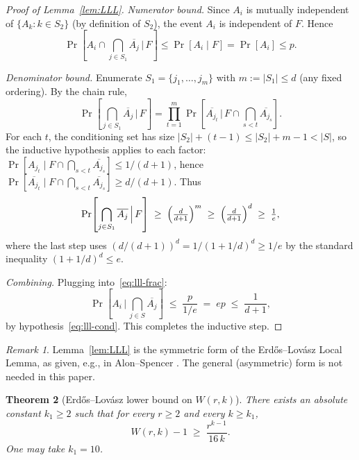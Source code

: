 \documentclass[11pt,reqno,a4paper]{amsart}
\theoremstyle{plain}
\newtheorem{theorem}{Theorem}[section]
\theoremstyle{definition}
\theoremstyle{remark}
\newtheorem{remark}[theorem]{Remark}
\numberwithin{equation}{section}
\begin{document}
\begin{proof}[Proof of Lemma~\ref{lem:LLL}]
\emph{Numerator bound.} Since $A_{i}$ is mutually independent of
$\{A_{k}:k\in S_{2}\}$ (by definition of $S_{2}$), the event $A_{i}$
is independent of $F$. Hence
\[
\Pr\!\left[A_{i}\cap\bigcap_{j\in S_{1}}\overline{A_{j}}\,\Big|\,F\right]
\le\Pr[A_{i}\mid F]=\Pr[A_{i}]\le p.
\]

\emph{Denominator bound.} Enumerate $S_{1}=\{j_{1},\ldots,j_{m}\}$ with
$m:=|S_{1}|\le d$ (any fixed ordering). By the chain rule,
\[
\Pr\!\left[\bigcap_{j\in S_{1}}\overline{A_{j}}\,\Big|\,F\right]
=\prod_{t=1}^{m}\Pr\!\left[\overline{A_{j_{t}}}\,\Big|\,F\cap\bigcap_{s<t}\overline{A_{j_{s}}}\right].
\]
For each $t$, the conditioning set has size
$|S_{2}|+(t-1)\le|S_{2}|+m-1<|S|$, so the inductive hypothesis applies
to each factor:
$\Pr[A_{j_{t}}\mid F\cap\bigcap_{s<t}\overline{A_{j_{s}}}]\le 1/(d+1)$,
hence
$\Pr[\overline{A_{j_{t}}}\mid F\cap\bigcap_{s<t}\overline{A_{j_{s}}}]\ge d/(d+1)$.
Thus
\[
\Pr\!\left[\bigcap_{j\in S_{1}}\overline{A_{j}}\,\Big|\,F\right]
\;\ge\;\Bigl(\tfrac{d}{d+1}\Bigr)^{m}\;\ge\;\Bigl(\tfrac{d}{d+1}\Bigr)^{d}
\;\ge\;\tfrac{1}{e},
\]
where the last step uses $(d/(d+1))^{d}=1/(1+1/d)^{d}\ge 1/e$ by the
standard inequality $(1+1/d)^{d}\le e$.

\emph{Combining.} Plugging into~\eqref{eq:lll-frac}:
\[
\Pr\!\left[A_{i}\,\Big|\,\bigcap_{j\in S}\overline{A_{j}}\right]
\;\le\;\frac{p}{1/e}\;=\;ep\;\le\;\frac{1}{d+1},
\]
by hypothesis~\eqref{eq:lll-cond}. This completes the inductive step.
\end{proof}

\begin{remark}
\label{rem:LLL-ref}
Lemma~\ref{lem:LLL} is the symmetric form of the Erd\H{o}s--Lov\'asz
Local Lemma, as given, e.g., in Alon--Spencer
\cite[Chapter~5, Lemma~5.1.1 and Corollary~5.1.2]{AlonSpencer2016}.
The general (asymmetric) form is not needed in this paper.
\end{remark}

\begin{theorem}[Erd\H{o}s--Lov\'asz lower bound on $W(r,k)$]
\label{thm:EL}
There exists an absolute constant $k_{1}\ge 2$ such that for every
$r\ge 2$ and every $k\ge k_{1}$,
\begin{equation}
W(r,k)-1\;\ge\;\frac{r^{k-1}}{16\,k}.
\label{eq:EL}
\end{equation}
One may take $k_{1}=10$.
\end{theorem}
\end{document}
